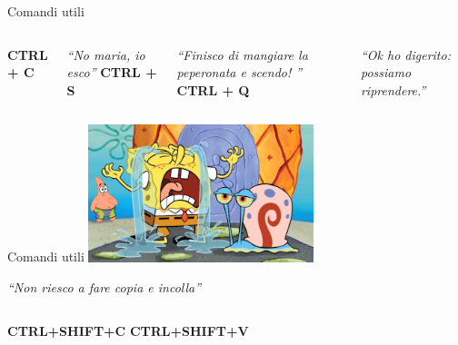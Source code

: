 \documentclass{beamer}
\begin{document}
    \begin{frame}{Comandi utili}
        \begin{columns}[t, onlytextwidth]
                \centering
                \Huge \textbf{CTRL + C}
                
                \vspace{0.2cm}
                
                \normalsize \textit{``No maria, io esco''}
                \centering
                \Huge \textbf{CTRL + S}

                \vspace{0.2cm}

                \normalsize \textit{``Finisco di mangiare la peperonata e scendo! ''}
                \centering
                \Huge \textbf{CTRL + Q}

                \vspace{0.2cm}

                \normalsize \textit{``Ok ho digerito: possiamo riprendere.''}
        \end{columns}
    \end{frame}

    \begin{frame}{Comandi utili}
        \centering
        \includegraphics[height=4cm,keepaspectratio]{images/spongebob-crying.png}

        \Large \textit{``Non riesco a fare copia e incolla''}
        
        \vspace{1cm}

        \begin{columns}[t, onlytextwidth]
                \centering
                \huge \textbf{CTRL+SHIFT+C}
                \centering
                \huge \textbf{CTRL+SHIFT+V}
        \end{columns}
    \end{frame}
\end{document}
